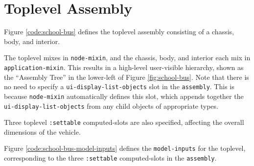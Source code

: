\documentclass [11pt]{book}
\begin{document}
\section{Toplevel Assembly}

\label{sec:toplevelassembly}

Figure 
\ref{code:school-bus} defines the toplevel assembly consisting of a chassis, body, and interior. 

The toplevel mixes in \texttt{node-mixin}, and the chassis, body, and interior each mix in \texttt{application-mixin}. This results in a high-level user-visible hierarchy, shown as 
the ``Assembly Tree'' in the lower-left of Figure 
\ref{fig:school-bus}. Note that there is no need to specify a \texttt{ui-display-list-objects} slot in the \texttt{assembly}. This is because \texttt{node-mixin} automatically defines this slot, which appends together the \texttt{ui-display-list-objects} from any child objects of appropriate types.
       
Three toplevel \texttt{:settable} computed-slots are also specified, affecting the overall dimensions of the vehicle. 

Figure 
\ref{code:school-bus-model-inputs} defines the \texttt{model-inputs} for the toplevel, corresponding to the three \texttt{:settable} computed-slots in the \texttt{assembly}. 
\end{document}

